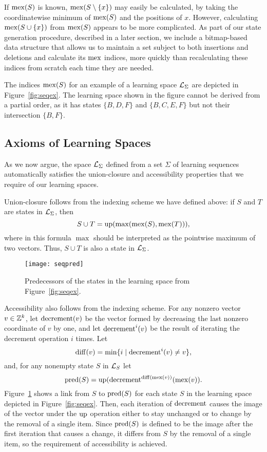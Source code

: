 \documentclass[11pt]{llncs}
\def\Zee{\ensuremath{\Bbb Z}}
\begin{document}
{If ${\rm mex}(S)$ is known, ${\rm mex}(S\setminus\{x\})$ may easily be calculated, by 
taking the coordinatewise minimum of ${\rm mex}(S)$ and the positions of $x$.
However, calculating ${\rm mex}(S\cup\{x\})$ from ${\rm mex}(S)$ appears to be more complicated.
As part of our state generation procedure, described in a later section, we include a bitmap-based data structure that allows us to maintain a set subject to both insertions and deletions and calculate its ${\rm mex}$ indices, more quickly than recalculating these indices from scratch each time they are needed.

The indices ${\rm mex}(S)$ for an example of a learning space ${\cal L}_\Sigma$ are depicted in Figure~\ref{fig:seqex}. The learning space shown in the figure cannot be derived from a partial order, as it has states $\{B,D,F\}$ and $\{B,C,E,F\}$ but not their intersection $\{B,F\}$.

\subsection{Axioms of Learning Spaces}

As we now argue, the space ${\cal L}_\Sigma$ defined from a set $\Sigma$ of learning sequences automatically satisfies the union-closure and accessibility properties that we require of our learning spaces.

Union-closure follows from the indexing scheme we have defined above:
if $S$ and $T$ are states in ${\cal L}_\Sigma$, then
$$S\cup T={\rm up}(\max({\rm mex}(S),{\rm mex}(T))),$$
where in this formula $\max$ should be interpreted as the pointwise maximum of two vectors.
Thus, $S\cup T$ is also a state in ${\cal L}_\Sigma$.

\begin{figure}[t]
\centering\texttt{[image: seqpred]}
\caption{Predecessors of the states in the learning space from Figure~\ref{fig:seqex}.}
\label{fig:seqpred}
\end{figure}

Accessibility also follows from the indexing scheme.
For any nonzero vector $v\in\Zee^k$, let ${\rm decrement}(v)$ be the vector formed by decreasing the last nonzero coordinate of $v$ by one, and let ${\rm decrement}^i(v)$ be the result of iterating the decrement operation $i$ times. Let
$${\rm diff}(v)=\min\{i\mid {\rm decrement}^i(v)\ne v\},$$ 
and, for any nonempty state $S$ in ${\cal L}_S$
let
$${\rm pred}(S) =
{\rm up}({\rm decrement}^{{\rm diff}({\rm mex}(v))}({\rm mex}(v)).$$
Figure~\ref{fig:seqpred} shows a link from $S$ to ${\rm pred}(S)$ for each state $S$ in the learning space depicted in Figure~\ref{fig:seqex}.
Then, each iteration of ${\rm decrement}$ causes the image of the vector under the ${\rm up}$ operation either to stay unchanged or to change by the removal of a single item. Since ${\rm pred}(S)$ is defined to be the image after the first iteration that causes a change, it differs from $S$ by the removal of a single item, so the requirement of accessibility is achieved.

}
\end{document}
